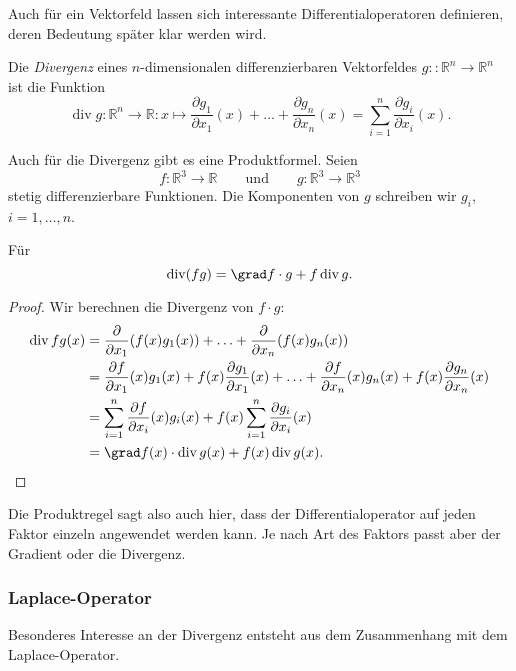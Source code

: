 Auch für ein Vektorfeld lassen sich interessante Differentialoperatoren
definieren, deren Bedeutung später klar werden wird.

\begin{definition}[Divergenz]
\label{buch:felder:fundamentallemme:def:divergenz}
Die {\em Divergenz} eines $n$-dimensionalen differenzierbaren
Vektorfeldes $g\colon:\mathbb{R}^n\to\mathbb{R}^n$ ist die Funktion
\[
\operatorname{div} g
\colon
\mathbb{R}^n\to\mathbb{R}
:
x \mapsto
\frac{\partial g_1}{\partial x_1}(x)
+\ldots+
\frac{\partial g_n}{\partial x_n}(x)
=
\sum_{i=1}^n
\frac{\partial g_i}{\partial x_i}(x).
\]
\end{definition}

Auch für die Divergenz gibt es eine Produktformel.
Seien
\[
f\colon\mathbb{R}^3\to\mathbb{R}
\qquad\text{und}\qquad
g\colon\mathbb{R}^3\to\mathbb{R}^3
\]
stetig differenzierbare Funktionen.
Die Komponenten von $g$ schreiben wir $g_i$, $i=1,\dots,n$.

\begin{satz}
Für 
\[
\operatorname{div}(fg)
=
\grad f \cdot g
+
f\operatorname{div}g.
\]
\end{satz}

\begin{proof}
Wir berechnen die Divergenz von $f\cdot g$:
\begin{align*}
\operatorname{div} fg(x)
&=
\frac{\partial}{\partial x_1}(f(x)g_1(x))
+
\ldots
+
\frac{\partial}{\partial x_n}(f(x)g_n(x))
\\
&=
\frac{\partial f}{\partial x_1}(x)g_1(x)
+f(x)\frac{\partial g_1}{\partial x_1}(x)
+
\ldots
+
\frac{\partial f}{\partial x_n}(x)g_n(x)
+f(x)\frac{\partial g_n}{\partial x_n}(x)
\\
&=
\sum_{i=1}^n \frac{\partial f}{\partial x_i}(x) g_i(x)
+
f(x)
\sum_{i=1}^n \frac{\partial g_i}{\partial x_i}(x)
\\
&=
\grad f(x)\cdot \operatorname{div} g(x)
+
f(x)\operatorname{div}g(x).
\qedhere
\end{align*}
\end{proof}

Die Produktregel sagt also auch hier, dass der Differentialoperator
auf jeden Faktor einzeln angewendet werden kann. 
Je nach Art des Faktors passt aber der Gradient oder die Divergenz.

%
%
\subsubsection{Laplace-Operator}
Besonderes Interesse an der Divergenz entsteht aus dem Zusammenhang
mit dem Laplace-Operator.

